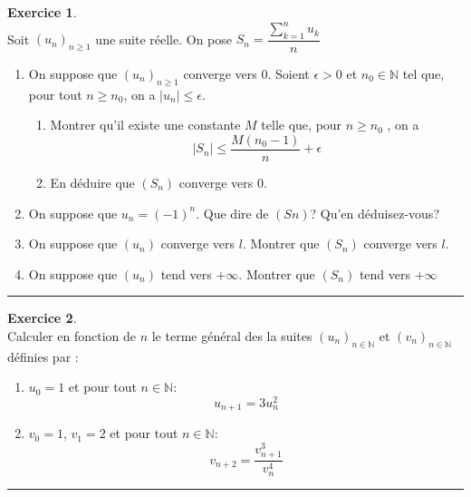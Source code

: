 \documentclass[10pt,a4paper]{article}
\newcommand{\N}{\mathbb{N}}
\theoremstyle{definition}
\theoremstyle{definition}
\newtheorem{exo}{Exercice}
\begin{document}
\begin{minipage}{1.0\linewidth}
\begin{minipage}[t]{0.47\linewidth}
\end{minipage}	
\hfill\vrule\hfill
\begin{minipage}[t]{0.47\linewidth}
\raggedright

\begin{exo}\quad\\
Soit $\left(u_n\right)_{n\geq 1}$ une suite réelle. On pose $ S_n = \dfrac{\sum_{k=1}^{n}u_k}{n}$
\begin{enumerate}
\item On suppose que  $\left(u_n\right)_{n\geq 1}$ converge vers $0$. Soient $\epsilon>0$ et $n_0\in\N$  tel que, pour tout $n\geq n_0$, on a $|u_n|\leq\epsilon$.
\begin{enumerate}
\item Montrer qu'il existe une constante $M$ telle que, pour $n\geq n_0$ , on a 
$$|S_n| \leq \dfrac{M(n_0-1)}{n} + \epsilon$$
\item En déduire que $(S_n)$ converge vers $0$. 
\end{enumerate}
\item  On suppose que $u_n=(-1)^n$. Que dire de $(Sn)$? Qu'en déduisez-vous? 
\item On suppose que $(u_n)$ converge vers $l$. Montrer que $(S_n)$ converge vers $l$.
\item On suppose que $(u_n)$ tend vers $+\infty$. Montrer que $(S_n)$ tend vers $+\infty$  
\end{enumerate}
\centering
\rule{1\linewidth}{0.6pt}
\end{exo}

\begin{exo}\quad\\
Calculer en fonction de $n$ le terme général des la suites $\left(u_n\right)_{n\in\N}$ et $\left(v_n\right)_{n\in\N}$définies par :
\begin{enumerate}
\item $u_0 = 1$ et pour tout $n\in\N$:  %
$$u_{n+1} = 3u_n^2$$
\item $v_0 = 1$, $v_1 = 2$ et pour tout $n\in\N$:
$$v_{n+2} = \dfrac{v_{n+1}^3}{v_{n}^4}$$
\end{enumerate}
\centering
\rule{1\linewidth}{0.6pt}
\end{exo}


	\end{minipage}
\end{minipage}

\newpage
\end{document}

